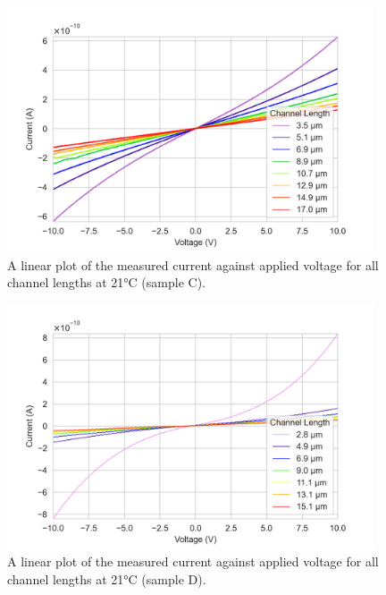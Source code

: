\begin{figure}[h]
    \centering
    \includegraphics[width=0.97\textwidth]{Chapter6/Figs/Raster/Sample C 2019/IV/10V IV characteristics at 21 C.png}
    \caption{A linear plot of the measured current against applied voltage for all channel lengths at 21\si{\degreeCelsius} (sample C).}
    \label{fig:C_current_voltage_21}
\end{figure}
\begin{figure}[h]
    \centering
    \includegraphics[width=0.97\textwidth]{Chapter6/Figs/Raster/Sample D 2019/IV/10V IV characteristics at 21 C.png}
    \caption{A linear plot of the measured current against applied voltage for all channel lengths at 21\si{\degreeCelsius} (sample D).}
    \label{fig:D_current_voltage_21_10V}
\end{figure}

